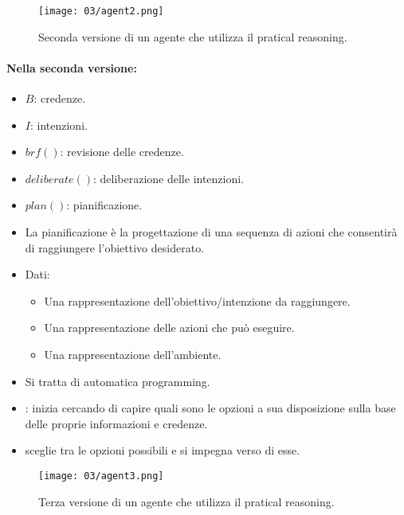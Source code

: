 \begin{figure}[!h]
    \centering
    \texttt{[image: 03/agent2.png]}
    \caption{Seconda versione di un agente che utilizza il pratical reasoning.}
\end{figure}

\paragraph{Nella seconda versione:}

\begin{itemize}
  \item $B$: credenze. 
  \item $I$: intenzioni. 
  \item $brf()$: revisione delle credenze. 
  \item $deliberate()$: deliberazione delle intenzioni. 
  \item $plan()$: pianificazione.
  \item La pianificazione è la progettazione di una sequenza di azioni che consentirà di raggiungere l'obiettivo desiderato. 
  \item Dati: 
    \begin{itemize}
      \item Una rappresentazione dell'obiettivo/intenzione da raggiungere. 
      \item Una rappresentazione delle azioni che può eseguire. 
      \item Una rappresentazione dell'ambiente.
    \end{itemize}
  \item Si tratta di automatica programming.
\end{itemize}


\begin{itemize}
  \item {}: inizia cercando di capire quali sono le opzioni a sua disposizione sulla base delle proprie informazioni e credenze. 
  \item {} sceglie tra le opzioni possibili e si impegna verso di esse. 
\end{itemize}


\begin{figure}[!h]
    \centering
    \texttt{[image: 03/agent3.png]}
  \caption{Terza versione di un agente che utilizza il pratical reasoning.}
\end{figure}

